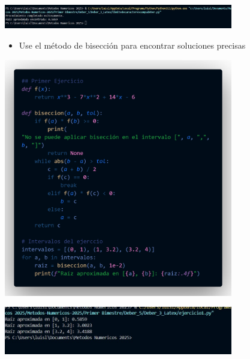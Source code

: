 \documentclass[12pt]{article}
\begin{document}
\vspace{0.5cm}

\begin{minipage}{0.75\textwidth}
    \raggedleft
    \includegraphics[width=0.75\textwidth]{inFiles/Figures/ejec1.jpg}
\end{minipage}

\vspace{0.5cm}

\begin{itemize}
\item {Use el método de bisección para encontrar soluciones precisas }
\end{itemize}

\begin{minipage}{0.75\textwidth}
    \raggedleft
    \includegraphics[width=0.75\textwidth]{inFiles/Figures/cd1.png}
\end{minipage}

\vspace{0.5cm}

\begin{minipage}{0.75\textwidth}
    \raggedleft
    \includegraphics[width=0.75\textwidth]{inFiles/Figures/ejec2.jpg}
\end{minipage}
\end{document}
